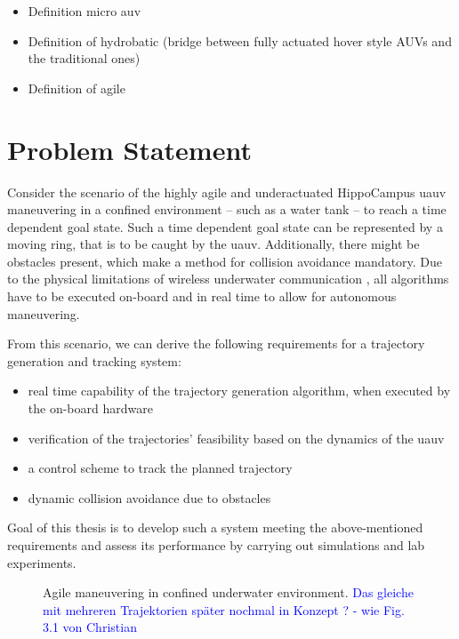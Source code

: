 \begin{itemize}
    \color{red}
    \item Definition micro auv \cite{micro-auv}
    \item Definition of hydrobatic \cite{hydrobatic} (bridge between fully actuated hover style AUVs and the traditional ones)
    \item Definition of agile \cite{duecker-phd}
    
\end{itemize}











\section{Problem Statement}
Consider the scenario of the highly agile and underactuated HippoCampus \ac{uauv} maneuvering in a confined environment -- such as a water tank -- to reach a time dependent goal state.
Such a time dependent goal state can be represented by a moving ring, that is to be caught by the \ac{uauv}.
Additionally, there might be obstacles present, which make a method for collision avoidance mandatory.
Due to the physical limitations of wireless underwater communication \cite{Bettale08p1,GeistEtAl16}, all algorithms have to be executed on-board and in real time to allow for autonomous maneuvering.

From this scenario, we can derive the following requirements for a trajectory generation and tracking system:

\begin{itemize}
    \item real time capability of the trajectory generation algorithm, when executed by the on-board hardware
    \item verification of the trajectories' feasibility based on the dynamics of the \ac{uauv}
    \item a control scheme to track the planned trajectory
    \item dynamic collision avoidance due to obstacles
\end{itemize}

Goal of this thesis is to develop such a system meeting the above-mentioned requirements and assess its performance by carrying out simulations and lab experiments.

\begin{figure}
    \centering
    
    \caption{Agile maneuvering in confined underwater environment. \textcolor{blue}{Das gleiche mit mehreren Trajektorien später nochmal in Konzept ? - wie Fig. 3.1 von Christian}}
    \label{fig:agile_maneuvering_motivation}
\end{figure}


